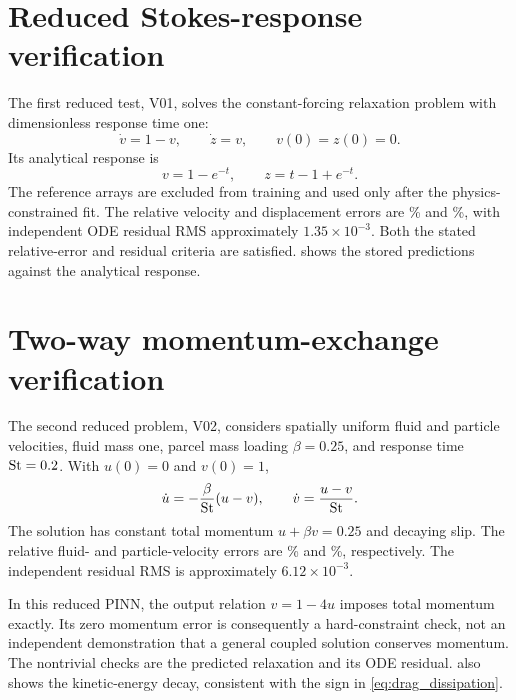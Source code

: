 \section{Reduced Stokes-response verification}
The first reduced test, V01, solves the constant-forcing relaxation problem
with dimensionless response time one:
\begin{equation}
 \dot v=1-v,\qquad \dot z=v,\qquad v(0)=z(0)=0.
 \label{eq:stokes_test}
\end{equation}
Its analytical response is
\begin{equation}
 v=1-e^{-t},\qquad z=t-1+e^{-t}.
 \label{eq:stokes_exact}
\end{equation}
The reference arrays are excluded from training and used only after the
physics-constrained fit. The relative velocity and displacement errors are
\VOneVelocity\% and \VOneDistance\%, with independent ODE residual RMS
approximately $1.35\times10^{-3}$. Both the stated relative-error and
residual criteria are satisfied.  shows the
stored predictions against the analytical response.


\section{Two-way momentum-exchange verification}
The second reduced problem, V02, considers spatially uniform fluid and
particle velocities, fluid mass one, parcel mass loading $\beta=0.25$,
and response time $\mathrm{St}=0.2$. With $u(0)=0$ and $v(0)=1$,
\begin{equation}
 \dot u=-\frac{\beta}{\mathrm{St}}(u-v),\qquad
 \dot v=\frac{u-v}{\mathrm{St}}.
 \label{eq:two_way_test}
\end{equation}
The solution has constant total momentum $u+\beta v=0.25$ and decaying
slip. The relative fluid- and particle-velocity errors are
\VTwoFluid\% and \VTwoParticle\%, respectively. The independent residual
RMS is approximately $6.12\times10^{-3}$.

In this reduced PINN, the output relation $v=1-4u$ imposes total momentum
exactly. Its zero momentum error is consequently a hard-constraint check,
not an independent demonstration that a general coupled solution conserves
momentum. The nontrivial checks are the predicted relaxation and its ODE
residual.  also shows the kinetic-energy decay,
consistent with the sign in \cref{eq:drag_dissipation}.

